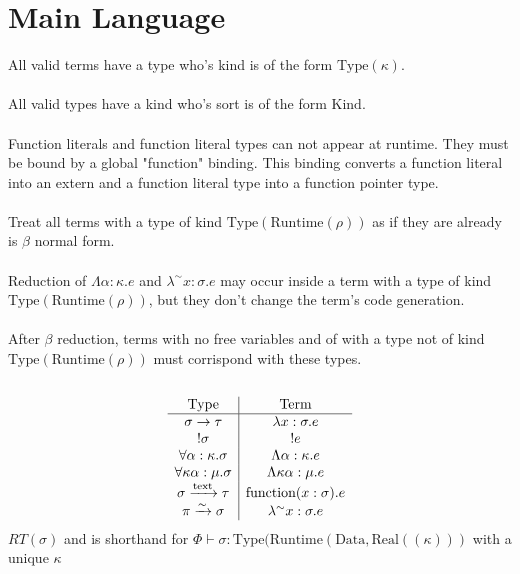 \documentclass {article}
\begin{document}
\tableofcontents


\section{Main Language}

All valid terms have a type who's kind is of the form $ \text{Type} (\kappa) $. \\
\\
All valid types have a kind who's sort is of the form $ \text{Kind} $.\\
\\
Function literals and function literal types can not appear at runtime. They must be bound by a global "function" binding.
This binding converts a function literal into an extern and a function literal type into a function pointer type. \\
\\
Treat all terms with a type of kind $ \text{Type} (\text{Runtime} (\rho)) $ as if they are already is $ \beta $ normal form. \\
\\
Reduction of $ \Lambda \alpha : \kappa. e $ and $ \lambda^\sim x : \sigma. e $ may occur inside a term with a type of kind $ \text{Type} (\text{Runtime} (\rho)) $, but they don't
change the term's code generation. \\
\\
After $ \beta $ reduction, terms with no free variables and of with a type not of kind $ \text{Type} (\text{Runtime} (\rho) ) $ must corrispond with these types. \\
\\

\begin{gather*}
\begin{array}{c | c}
\text{Type} & \text{Term} \\
\hline
\sigma \to \tau & \lambda x : \sigma. e \\
!\sigma & !e \\
\forall \alpha : \kappa. \sigma & \Lambda \alpha : \kappa. e  \\
\forall \kappa \alpha : \mu. \sigma & \Lambda \kappa \alpha : \mu. e \\
\sigma \xrightarrow{\text{text}} \tau & \text{function}(x : \sigma). e \\
\pi \xrightarrow{\sim} \sigma & \lambda^\sim x : \sigma. e
\end{array}
\\
\end{gather*}
$ RT (\sigma) $ and is shorthand for $ \Phi \vdash \sigma : \text{Type} (\text{Runtime} (\text{Data}, \text{Real} ((\kappa))) $ with a unique $ \kappa $ \\
\end{document}
